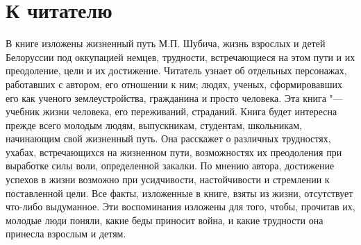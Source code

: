 ﻿\chapter{К читателю}
В книге изложены жизненный путь М.П. Шубича, жизнь взрослых и детей Белоруссии под оккупацией немцев, трудности, встречающиеся на этом пути и их преодоление, цели и их достижение.
Читатель узнает об отдельных персонажах, работавших с автором, его отношении к ним; людях, ученых, сформировавших его как ученого землеустройства, гражданина и просто человека. Эта книга "--- учебник жизни человека, его переживаний, страданий.
Книга будет интересна прежде всего молодым людям, выпускникам, студентам, школьникам, начинающим свой жизненный путь. Она расскажет о различных трудностях, ухабах, встречающихся на жизненном пути, возможностях их преодоления при выработке силы воли, определенной закалки. По мнению автора, достижение успехов в жизни возможно при усидчивости, настойчивости и стремлении к поставленной цели.
Все факты, изложенные в книге, взяты из жизни, отсутствует что-либо выдуманное. Эти воспоминания изложены для того, чтобы, прочитав их, молодые люди поняли, какие беды приносит война, и какие трудности она принесла взрослым и детям.